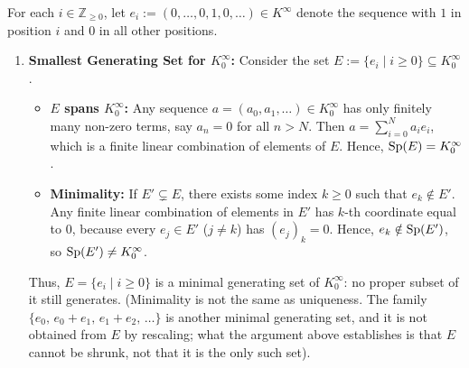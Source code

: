 \begin{exercisesolution}
\label{sol:generating_sets_sequences}
For each $i \in \mathbb{Z}_{\ge 0}$, let $e_i := (0, \dots, 0, 1, 0, \dots) \in K^\infty$ denote the sequence with $1$ in position $i$ and $0$ in all other positions.

\begin{enumerate}[label=\textbf{(\alph*)}]
    \item \textbf{Smallest Generating Set for $K_0^\infty$:}
    Consider the set $E := \{e_i \mid i \ge 0\} \subseteq K_0^\infty$.
    \begin{itemize}
        \item \textbf{$E$ spans $K_0^\infty$:} Any sequence $a = (a_0, a_1, \dots) \in K_0^\infty$ has only finitely many non-zero terms, say $a_n = 0$ for all $n > N$. Then $a = \sum_{i=0}^N a_i e_i$, which is a finite linear combination of elements of $E$. Hence, $\operatorname{Sp}(E) = K_0^\infty$.
        \item \textbf{Minimality:} If $E' \subsetneq E$, there exists some index $k \ge 0$ such that $e_k \notin E'$. Any finite linear combination of elements in $E'$ has $k$-th coordinate equal to $0$, because every $e_j \in E'$ ($j \ne k$) has $(e_j)_k = 0$. Hence, $e_k \notin \operatorname{Sp}(E')$, so $\operatorname{Sp}(E') \ne K_0^\infty$.
    \end{itemize}
    Thus, $E = \{e_i \mid i \ge 0\}$ is a minimal generating set of $K_0^\infty$: no proper subset of it still generates. (Minimality is not the same as uniqueness. The family $\{e_0,\, e_0 + e_1,\, e_1 + e_2,\, \dots\}$ is another minimal generating set, and it is not obtained from $E$ by rescaling; what the argument above establishes is that $E$ cannot be shrunk, not that it is the only such set).


\end{enumerate}
\end{exercisesolution}
